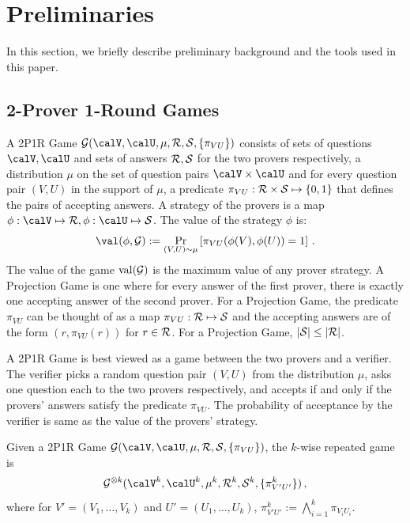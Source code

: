 \section{Preliminaries}
In this section, we briefly describe preliminary background and the tools used in this paper.

\subsection{2-Prover 1-Round Games}

\begin{definition} \label{def:2p1r} A 2P1R Game ${\cal G}(\calV, \calU, \mu, {\cal R}, {\cal S},
\{ \pi_{VU}\} )$ consists of sets of questions $\calV, \calU$ and
sets of answers ${\cal R}, {\cal S}$ for the two provers
respectively, a distribution $\mu$ on the set of question pairs
$\calV \times \calU$ and for every question pair $(V,U)$ in the
support of $\mu$, a predicate $\pi_{VU}: {\cal R} \times {\cal S}
\mapsto \{0,1\}$ that defines the pairs of accepting answers.
A strategy of the %
provers is a map $\phi: \calV
\mapsto {\cal R}, \phi: \calU \mapsto {\cal S}$. The value of the
strategy $\phi$ is:
\[
  \val(\phi, {\cal G}) := \Pr_{(V,U) \sim \mu} \left[ \pi_{VU} (
  \phi(V), \phi(U) ) =1
 \right]\,.
\]
The value of the game ${\rm val}({\cal G})$ is the maximum value of
any prover strategy. A Projection Game is one where for every answer
of the first prover, there is exactly one accepting answer of the
second prover. For a Projection Game, the predicate $\pi_{VU}$ can
be thought of as a map $\pi_{VU}: {\cal R} \mapsto {\cal S}$ and
the accepting answers are of the form $(r, \pi_{VU}(r))$ for $r \in {\cal R}$.
For a Projection Game, $|{\cal S}| \leq |{\cal R}|$.
\end{definition}

A 2P1R Game is
best viewed as a game between the two provers and a verifier. The verifier
picks a random question pair $(V,U)$
from the distribution $\mu$, asks one question each to the two provers respectively,
and accepts if and only if the provers' answers satisfy the predicate $\pi_{VU}$.
The probability of acceptance
%
by
the verifier is same as the value of 
%
the
provers' strategy.

\begin{definition} Given a 2P1R Game ${\cal G}(\calV, \calU, \mu, {\cal R}, {\cal S},
\{ \pi_{VU}\} )$, the $k$-wise repeated game is
 \[
{\cal G}^{\otimes k}(\calV^k, \calU^k, \mu^k, {\cal R}^k, {\cal S}^k,
\{ \pi^k_{V'U'}\} )\,,
\] where for $V' = (V_1, \ldots, V_k)$ and $U' =
(U_1,\ldots, U_k)$, $\pi^k_{V'U'} := \bigwedge_{i=1}^k \pi_{V_iU_i}$.
\end{definition}


